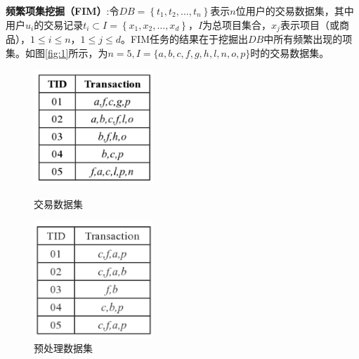 \documentclass[UTF8,a4paper]{ctexart}
\begin{document}
  \textbf{频繁项集挖掘（FIM）}:令$DB= \left\{ t_{1},t_{2},\ldots,t_{n}\right\}$表示$n$位用户的交易数据集，其中用户$u_{i}$的交易记录$t_{i} \subset I=\left\{x_{1}, x_{2}, \ldots, x_{d}\right\}$，$I$为总项目集合，$x_{j}$表示项目（或商品），$1 \leq i \leq n$，$1 \leq j \leq d$。FIM任务的结果在于挖掘出$DB$中所有频繁出现的项集。如图\ref{fig:1}所示，为$n=5,I=\{a,b,c,f,g,h,l,n,o,p\}$时的交易数据集。

  \begin{figure}[htbp]
  \begin{minipage}{0.5\linewidth}
    \centering
    \includegraphics[width=0.4\textwidth]{DB}
    \caption{交易数据集}
    \label{fig:1}
  \end{minipage}
  \hfill %
  \begin{minipage}{0.5\linewidth}
    \centering
    \includegraphics[width=0.4\textwidth]{2}
    \caption{预处理数据集}
    \label{figure:2}
  \end{minipage}
  \end{figure}


\end{document}

